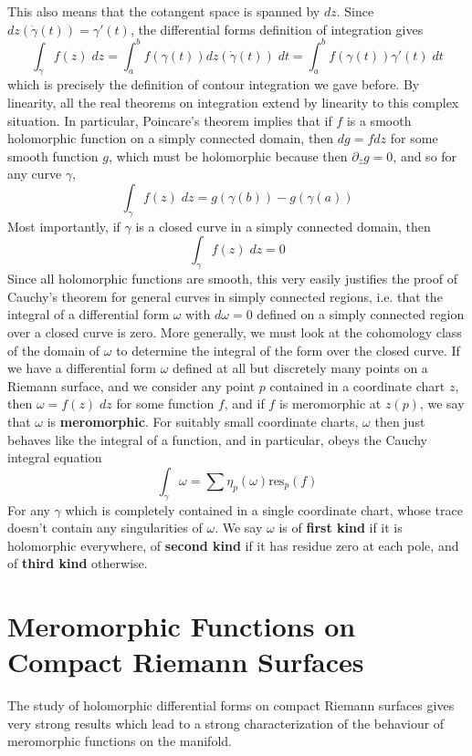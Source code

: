 This also means that the cotangent space is spanned by $dz$. Since $dz(\dot{\gamma}(t)) = \gamma'(t)$, the differential forms definition of integration gives
%
\[ \int_\gamma f(z)\; dz = \int_a^b f(\gamma(t)) dz \left(\dot{\gamma}(t) \right)\; dt = \int_a^b f(\gamma(t)) \gamma'(t)\; dt \]
%
which is precisely the definition of contour integration we gave before. By linearity, all the real theorems on integration extend by linearity to this complex situation. In particular, Poincare's theorem implies that if $f$ is a smooth holomorphic function on a simply connected domain, then $dg = f dz$ for some smooth function $g$, which must be holomorphic because then $\partial_{\overline{z}} g = 0$, and so for any curve $\gamma$,
%
\[ \int_\gamma f(z)\; dz = g(\gamma(b)) - g(\gamma(a)) \]
%
Most importantly, if $\gamma$ is a closed curve in a simply connected domain, then
%
\[ \int_\gamma f(z)\; dz = 0 \]
%
Since all holomorphic functions are smooth, this very easily justifies the proof of Cauchy's theorem for general curves in simply connected regions, i.e. that the integral of a differential form $\omega$ with $d \omega = 0$ defined on a simply connected region over a closed curve is zero. More generally, we must look at the cohomology class of the domain of $\omega$ to determine the integral of the form over the closed curve. If we have a differential form $\omega$ defined at all but discretely many points on a Riemann surface, and we consider any point $p$ contained in a coordinate chart $z$, then $\omega = f(z)\; dz$ for some function $f$, and if $f$ is meromorphic at $z(p)$, we say that $\omega$ is {\bf meromorphic}. For suitably small coordinate charts, $\omega$ then just behaves like the integral of a function, and in particular, obeys the Cauchy integral equation
%
\[ \int_\gamma \omega = \sum \eta_p(\omega) \text{res}_p(f) \]
%
For any $\gamma$ which is completely contained in a single coordinate chart, whose trace doesn't contain any singularities of $\omega$. We say $\omega$ is of {\bf first kind} if it is holomorphic everywhere, of {\bf second kind} if it has residue zero at each pole, and of {\bf third kind} otherwise.

\section{Meromorphic Functions on Compact Riemann Surfaces}

The study of holomorphic differential forms on compact Riemann surfaces gives very strong results which lead to a strong characterization of the behaviour of meromorphic functions on the manifold.

